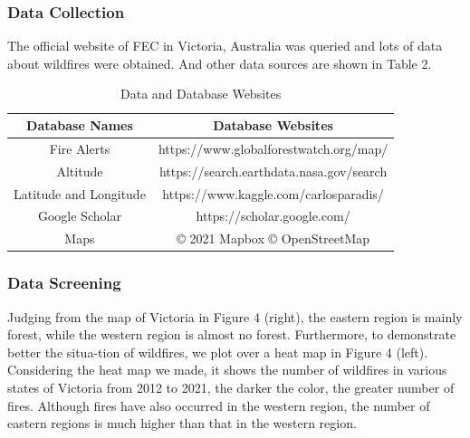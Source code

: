 \documentclass[12pt]{article}  %
\begin{document}
\subsubsection{Data Collection}
The official website of FEC in Victoria, Australia was queried and lots of data about wildfires were obtained. And other data sources are shown in Table 2.

\begin{table}[htbp]
\begin{center}
\caption{Data and Database Websites}
\resizebox{\textwidth}{!}
{\begin{tabular}{c c}
\toprule[2pt]
\multicolumn{1}{m{5cm}}{\centering \textbf{Database Names}}
&\multicolumn{1}{m{10cm}}{\centering \textbf{Database Websites} }\\ %
\midrule
Fire Alerts& https://www.globalforestwatch.org/map/ \\
Altitude & https://search.earthdata.nasa.gov/search \\
Latitude and Longitude & https://www.kaggle.com/carlosparadis/\\ 
Google Scholar & https://scholar.google.com/ \\
Maps& \copyright{} 2021 Mapbox \copyright{} OpenStreetMap\\
\bottomrule[2pt]
\end{tabular}}
\end{center}
\end{table}

\subsubsection{Data Screening}
Judging from the map of Victoria in Figure 4 (right), the eastern region is mainly forest, while the western region is almost no forest. Furthermore, to demonstrate better the situa-tion of wildfires, we plot over a heat map in Figure 4 (left).
Considering the heat map we made, it shows the number of wildfires in various states of Victoria from 2012 to 2021, the darker the color, the greater number of fires. Although fires have also occurred in the western region, the number of eastern regions is much higher than that in the western region. 
\end{document}
